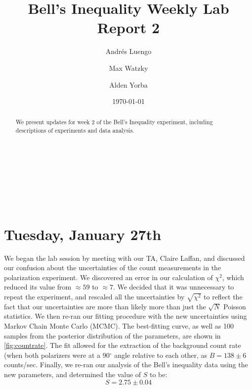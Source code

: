 \documentclass[letter,scriptaddress,twocolumn, prl,showkeys]{revtex4}
\begin{document}
\title{Bell's Inequality Weekly Lab Report 2}

\author{Andr\'{e}s Luengo} \\
\author{Max Watzky} \\ 
\author{Alden Yorba} \\ 


\date{\today}

\begin{abstract}
  We present updates for week 2 of the Bell's Inequality experiment, including descriptions of experiments and data analysis.
\end{abstract}


\maketitle

\section{Tuesday, January 27th}

We began the lab session by meeting with our TA, Claire Laffan, and discussed our confusion about the uncertainties of the count measurements in the polarization experiment. We discovered an error in our calculation of $\chi^2$, which reduced its value from $\approx 59$ to $\approx 7$. We decided that it was unnecessary to repeat the experiment, and rescaled all the uncertainties by $\sqrt{\chi^2}$ to reflect the fact that our uncertainties are more than likely more than just the $\sqrt N$ Poisson statistics. We then re-ran our fitting procedure with the new uncertainties using Markov Chain Monte Carlo (MCMC). The best-fitting curve, as well as 100 samples from the posterior distribution of the parameters, are shown in \autoref{fig:countrate}. The fit allowed for the extraction of the background count rate (when both polarizers were at a 90$^\circ$ angle relative to each other, as $B = 138 \pm 6$ counts/sec. Finally, we re-ran our analysis of the Bell's inequality data using the new parameters, and determined the value of $S$ to be:
\begin{equation}
    S = 2.75 \pm 0.04
\end{equation}
        
\end{document}
